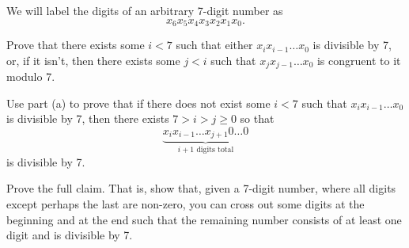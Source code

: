 \documentclass[12pt]{exam}
\begin{document}
We will label the digits of an arbitrary 7-digit number as $$x_6 x_5 x_4 x_3 x_2 x_1 x_0.$$
\begin{qparts}
    \item Prove that there exists some $i < 7$ such that either $x_i x_{i-1} \dots x_0$ is divisible by 7,
    or, if it isn't, then there exists some $j < i$ such that $x_j x_{j-1} \dots x_0$ is congruent to it
    modulo 7.
    \item Use part (a) to prove that if there does not exist some $i < 7$ such that $x_i x_{i-1} \dots x_0$ is divisible by 7, then there exists $7 > i > j \geq 0$ so that $$\underbrace{x_ix_{i-1}\dots x_{j+1} 0 \dots 0}_{i + 1 \text{ digits total}}$$ is divisible by 7.
    \item Prove the full claim. That is, show that, given a 7-digit number, where all digits except perhaps the last are non-zero, you can cross out some digits at the beginning and at the end such that the remaining number consists of at least one digit and is divisible by 7.
\end{qparts}
\end{document}
